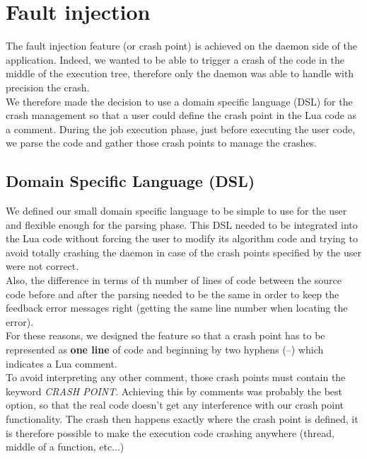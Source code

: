 \documentclass{eplmastersthesis}
\begin{document}
    \section{Fault injection}

      The fault injection feature (or crash point) is achieved on the daemon
      side of the application. Indeed, we wanted to be able to trigger a crash
      of the code in the middle of the execution tree, therefore only the
      daemon was able to handle with precision the crash.\\

      We therefore made the decision to use a domain specific language (DSL)
      for the crash management so that a user could define the crash point
      in the Lua code as a comment. During the job execution phase, just before
      executing the user code, we parse the code and gather those crash
      points to manage the crashes.

      \subsection{Domain Specific Language (DSL)}

        We defined our small domain specific language to be simple to use
        for the user and flexible enough for the parsing phase. This DSL
        needed to be integrated into the Lua code without forcing the user to
        modify its algorithm code and trying to avoid totally crashing
        the daemon in case of the crash points specified by the user were
        not correct.\\
        Also, the difference in terms of th number of lines of code between the
        source code before and after the parsing needed to be the same in
        order to keep the feedback error messages right (getting the same line
        number when locating the error).\\

        For these reasons, we designed the feature so that a crash point has
        to be represented as \textbf{one line} of code and beginning by
        two hyphens (--) which indicates a Lua comment.\\
        To avoid interpreting any other comment, those crash points must
        contain the keyword \textit{CRASH POINT}. Achieving this by comments
        was probably the best option, so that the real code doesn't get any
        interference with our crash point functionality. The crash then
        happens exactly where the crash point is defined, it is therefore
        possible to make the execution code crashing anywhere (thread, middle
        of a function, etc...)\\
\end{document}
